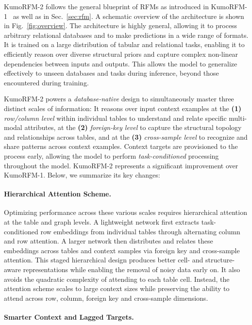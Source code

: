 \documentclass{article}
\newcommand{\onezero}{1\xspace}
\newcommand{\twozero}{2\xspace}
\newcommand{\name}{KumoRFM\xspace}
\newcommand{\nameone}{\name-\onezero}
\newcommand{\nametwo}{\name-\twozero}
\begin{document}
\nametwo follows the general blueprint of RFMs as introduced in \nameone~\citep{fey2025kumorfm} as well as in Sec.~\ref{sec:rfm}. A schematic overview of the architecture is shown in Fig.~\ref{fig:overview}.
The architecture is highly general, allowing it to process arbitrary relational databases and to make predictions in a wide range of formats. It 
is trained on a large distribution of tabular and relational tasks, enabling it to efficiently reason over diverse structural priors and capture complex non-linear dependencies between inputs and outputs.
This allows the model to generalize effectively to unseen databases and tasks during inference, beyond those encountered during training.

\nametwo powers a \emph{database-native} design to simultaneously master three distinct scales of information:
It reasons over input context examples at the \textbf{(1)} \emph{row/column level} within individual tables to understand and relate specific multi-modal attributes, at the \textbf{(2)} \emph{foreign-key level} to capture the structural topology and relationships across tables, and at the \textbf{(3)} \emph{cross-sample level} to recognize and share patterns across context examples. Context targets are provisioned to the process early, allowing the model to perform \emph{task-conditioned} processing throughout the model.
\nametwo represents a significant improvement over \nameone.
Below, we summarize its key changes:

\paragraph{Hierarchical Attention Scheme.}

Optimizing performance across these various scales requires hierarchical attention at the table and graph levels.
A lightweight network first extracts task-conditioned row embeddings from individual tables through alternating column and row attention. 
A larger network then distributes and relates these embeddings across tables and context samples via foreign key and cross-sample attention. 
This staged hierarchical design produces better cell- and structure-aware representations while enabling the removal of noisy data early on.
It also avoids the quadratic complexity of attending to each table cell.
Instead, the attention scheme scales to large context sizes while preserving the ability to attend across row, column, foreign key and cross-sample dimensions.

\paragraph{Smarter Context and Lagged Targets.}
\end{document}
